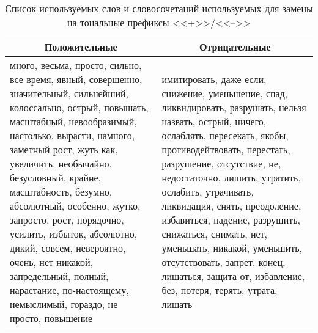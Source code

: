 \begin{table}[htp!]
\centering
\caption{Список используемых слов и словосочетаний используемых для замены на тональные префиксы <<+>>/<<-->>}
\label{table:tone_prefixes}
\begin{tabular}{p{7.2cm}p{7.2cm}}
\hline
\multicolumn{1}{c|}{Положительные}                                                                                                                                                                                                                                                                                                                 & \multicolumn{1}{c}{Отрицательные}                                                                                                                                                                                                                                                                                  \\ \hline
много, весьма, просто, сильно, все время, явный, совершенно, значительный, сильнейший, колоссально, острый, повышать, масштабный, невообразимый, настолько, вырасти, намного, заметный рост, жуть как, увеличить, необычайно, безусловный, крайне, масштабность, безумно, абсолютный, особенно, жутко, запросто, рост, порядочно, усилить, избыток, абсолютно, дикий, совсем, невероятно, очень, нет никакой, запредельный, полный, нарастание, по-настоящему, немыслимый, гораздо, не просто, повышение & имитировать, даже если, снижение, уменьшение, спад, ликвидировать, разрушать, нельзя назвать, острый, ничего, ослаблять, пересекать, якобы, противодейтвовать, перестать, разрушение, отсутствие, не, недостаточно, лишить, утратить, ослабить, утрачивать, ликвидация, снять, преодоление, избавиться, падение, разрушить, снижаться, снимать, нет, уменьшать, никакой, уменьшить, отсутствовать, запрет, конец, лишаться, защита от, избавление, без, потеря, терять, утрата, лишать\\ \hline
\end{tabular}
\end{table}

